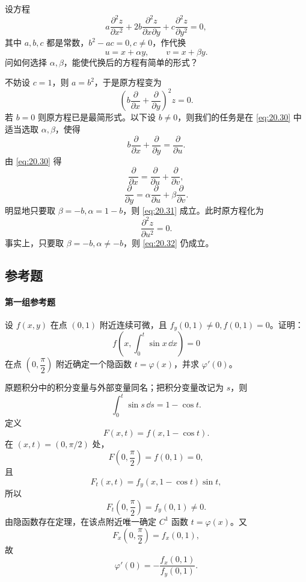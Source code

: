 \begin{xexample}[20.5.2]
设方程
\[
  a\frac{\partial^2z}{\partial x^2}
  +2b\frac{\partial^2z}{\partial x\partial y}
  +c\frac{\partial^2z}{\partial y^2}=0,
\]
其中 $a,b,c$ 都是常数，$b^2-ac=0,c\ne0$，作代换
\begin{equation}
  u=x+\alpha y,\qquad v=x+\beta y.
  \tag{20.30}
  \label{eq:20.30}
\end{equation}
问如何选择 $\alpha,\beta$，能使代换后的方程有简单的形式？
\end{xexample}
\begin{xsolution}
不妨设 $c=1$，则 $a=b^2$，于是原方程变为
\[
  \left(b\frac\partial{\partial x}+\frac\partial{\partial y}\right)^2z=0.
\]
若 $b=0$ 则原方程已是最简形式。以下设 $b\ne0$，则我们的任务是在 \eqref{eq:20.30} 中适当选取 $\alpha,\beta$，使得
\begin{equation}
  b\frac\partial{\partial x}+\frac\partial{\partial y}=\frac\partial{\partial u}.
  \tag{20.31}
  \label{eq:20.31}
\end{equation}
由 \eqref{eq:20.30} 得
\[
  \frac\partial{\partial x}=\frac\partial{\partial u}+\frac\partial{\partial v},
\]
\[
  \frac\partial{\partial y}=\alpha\frac\partial{\partial u}+\beta\frac\partial{\partial v}.
\]
明显地只要取 $\beta=-b,\alpha=1-b$，则 \eqref{eq:20.31} 成立。此时原方程化为
\begin{equation}
  \frac{\partial^2z}{\partial u^2}=0.
  \tag{20.32}
  \label{eq:20.32}
\end{equation}
事实上，只要取 $\beta=-b,\alpha\ne-b$，则 \eqref{eq:20.32} 仍成立。
\end{xsolution}

\subsection{参考题}

\paragraph{第一组参考题}

\begin{xreferenceproblem}[1]
设 $f(x,y)$ 在点 $(0,1)$ 附近连续可微，且 $f_y(0,1)\ne0,f(0,1)=0$。证明：
  \[
    f\left(x,\int_0^t\sin x\,\dd x\right)=0
  \]
  在点 $\left(0,\dfrac\pi2\right)$ 附近确定一个隐函数 $t=\varphi(x)$，并求 $\varphi'(0)$。
\end{xreferenceproblem}
\begin{xsolution}
原题积分中的积分变量与外部变量同名；把积分变量改记为 $s$，则
\[
  \int_0^t\sin s\,\dd s=1-\cos t.
\]
定义
\[
  F(x,t)=f(x,1-\cos t).
\]
在 $(x,t)=(0,\pi/2)$ 处，
\[
  F\left(0,\frac\pi2\right)=f(0,1)=0,
\]
且
\[
  F_t(x,t)=f_y(x,1-\cos t)\sin t,
\]
所以
\[
  F_t\left(0,\frac\pi2\right)=f_y(0,1)\ne0.
\]
由隐函数存在定理，在该点附近唯一确定 $C^1$ 函数 $t=\varphi(x)$。又
\[
  F_x\left(0,\frac\pi2\right)=f_x(0,1),
\]
故
\[
  \boxed{\displaystyle
    \varphi'(0)=-\frac{f_x(0,1)}{f_y(0,1)}}.
\]
\end{xsolution}


